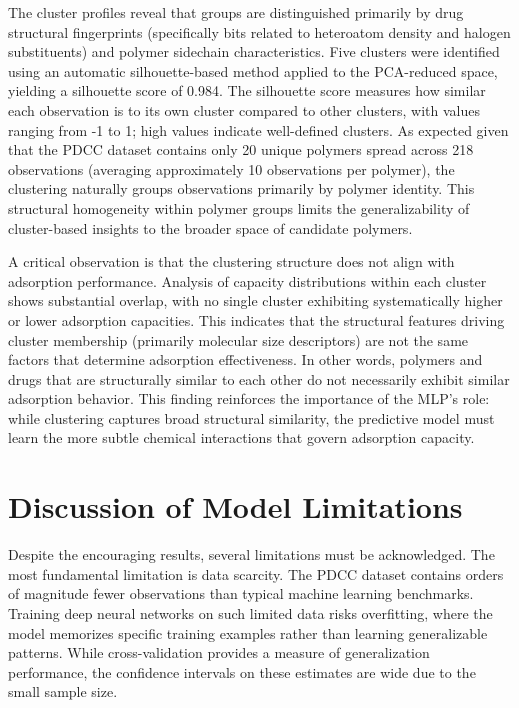The cluster profiles reveal that groups are distinguished primarily by drug structural fingerprints (specifically bits related to heteroatom density and halogen substituents) and polymer sidechain characteristics. Five clusters were identified using an automatic silhouette-based method applied to the PCA-reduced space, yielding a silhouette score of 0.984. The silhouette score measures how similar each observation is to its own cluster compared to other clusters, with values ranging from -1 to 1; high values indicate well-defined clusters. As expected given that the PDCC dataset contains only 20 unique polymers spread across 218 observations (averaging approximately 10 observations per polymer), the clustering naturally groups observations primarily by polymer identity. This structural homogeneity within polymer groups limits the generalizability of cluster-based insights to the broader space of candidate polymers.

A critical observation is that the clustering structure does not align with adsorption performance. Analysis of capacity distributions within each cluster shows substantial overlap, with no single cluster exhibiting systematically higher or lower adsorption capacities. This indicates that the structural features driving cluster membership (primarily molecular size descriptors) are not the same factors that determine adsorption effectiveness. In other words, polymers and drugs that are structurally similar to each other do not necessarily exhibit similar adsorption behavior. This finding reinforces the importance of the MLP's role: while clustering captures broad structural similarity, the predictive model must learn the more subtle chemical interactions that govern adsorption capacity.

\section{Discussion of Model Limitations}
\label{sec:model_limitations}

Despite the encouraging results, several limitations must be acknowledged. The most fundamental limitation is data scarcity. The PDCC dataset contains orders of magnitude fewer observations than typical machine learning benchmarks. Training deep neural networks on such limited data risks overfitting, where the model memorizes specific training examples rather than learning generalizable patterns. While cross-validation provides a measure of generalization performance, the confidence intervals on these estimates are wide due to the small sample size.

